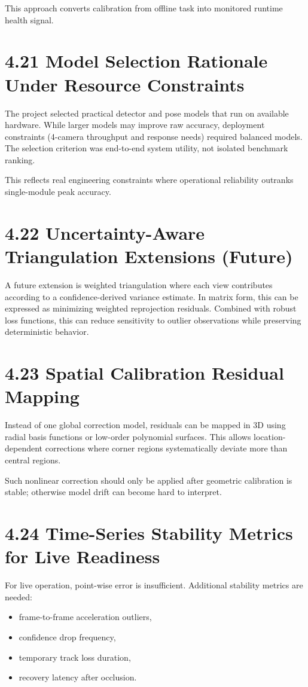 This approach converts calibration from offline task into monitored runtime health signal.

\section{4.21 Model Selection Rationale Under Resource Constraints}
The project selected practical detector and pose models that run on available hardware. While larger models may improve raw accuracy, deployment constraints (4-camera throughput and response needs) required balanced models. The selection criterion was end-to-end system utility, not isolated benchmark ranking.

This reflects real engineering constraints where operational reliability outranks single-module peak accuracy.



\section{4.22 Uncertainty-Aware Triangulation Extensions (Future)}
A future extension is weighted triangulation where each view contributes according to a confidence-derived variance estimate. In matrix form, this can be expressed as minimizing weighted reprojection residuals. Combined with robust loss functions, this can reduce sensitivity to outlier observations while preserving deterministic behavior.

\section{4.23 Spatial Calibration Residual Mapping}
Instead of one global correction model, residuals can be mapped in 3D using radial basis functions or low-order polynomial surfaces. This allows location-dependent corrections where corner regions systematically deviate more than central regions.

Such nonlinear correction should only be applied after geometric calibration is stable; otherwise model drift can become hard to interpret.

\section{4.24 Time-Series Stability Metrics for Live Readiness}
For live operation, point-wise error is insufficient. Additional stability metrics are needed:
\begin{itemize}
  \item frame-to-frame acceleration outliers,
  \item confidence drop frequency,
  \item temporary track loss duration,
  \item recovery latency after occlusion.
\end{itemize}

